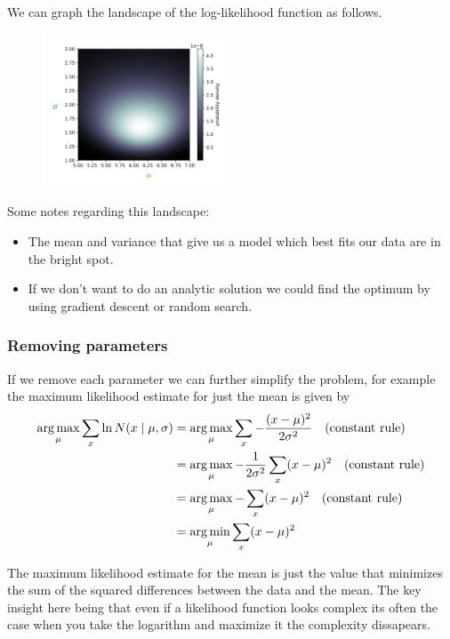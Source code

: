 \documentclass[12pt]{article}
\begin{document}
We can graph the landscape of the log-likelihood function as follows. 
\begin{figure}[!h]
    \centering
    \includegraphics[width=0.5\textwidth]{assets/probdensity.png}
\end{figure}

Some notes regarding this landscape: 
\begin{itemize}[leftmargin=*, noitemsep]
    \item The mean and variance that give us a model which best fits our data are in the bright spot.
    \item If we don't want to do an analytic solution we could find the optimum by using gradient descent or random search.
\end{itemize}

\subsubsection*{Removing parameters}

If we remove each parameter we can further simplify the problem, for example the maximum likelihood estimate for just the mean is given by 
\begin{align*}
    \operatorname*{arg\, max}_{\mu} \sum_{x} \ln N(x\mid \mu, \sigma) & = \operatorname*{arg\, max}_{\mu} \sum_{x} -\frac{(x-\mu)^2}{2\sigma^2} \quad \text{(constant rule)}\\
    & = \operatorname*{arg\, max}_{\mu} -\frac{1}{2\sigma^2} \sum_{x} (x-\mu)^2 \quad \text{(constant rule)}\\
    & = \operatorname*{arg\, max}_{\mu} - \sum_{x} (x-\mu)^2 \quad \text{(constant rule)}\\ 
    & = \operatorname*{arg\, min}_{\mu} \sum_{x} (x-\mu)^2
\end{align*}

The maximum likelihood estimate for the mean is just the value that minimizes the sum of the squared differences between the data and the mean. The key insight here being that even if a likelihood function looks complex its often the case when you take the logarithm and maximize it the complexity dissapears.
\end{document}
